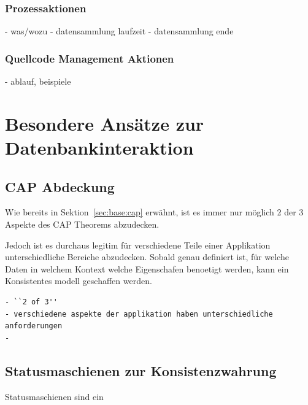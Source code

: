 \FloatBarrier
\subsubsection{Prozessaktionen}

- was/wozu
- datensammlung laufzeit
- datensammlung ende

\subsubsection{Quellcode Management Aktionen}

- ablauf, beispiele



\section{Besondere Ans\"atze zur Datenbankinteraktion}



\subsection{CAP Abdeckung}

Wie bereits in Sektion~\ref{sec:base:cap} erw\"ahnt,
ist es immer nur m\"oglich 2 der 3 Aspekte des CAP Theorems abzudecken.

Jedoch ist es durchaus legitim f\"ur verschiedene Teile einer Applikation unterschiedliche Bereiche abzudecken.
Sobald genau definiert ist, f\"ur welche Daten in welchem Kontext welche Eigenschafen benoetigt werden,
kann ein Konsistentes modell geschaffen werden.



\begin{verbatim}
- ``2 of 3''
- verschiedene aspekte der applikation haben unterschiedliche anforderungen
- 

\end{verbatim}




\subsection{Statusmaschienen zur Konsistenzwahrung}


Statusmaschienen sind ein 

